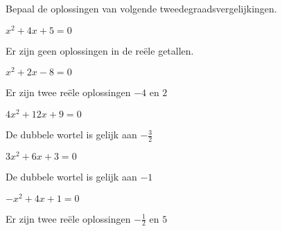 \documentclass{ximera}
\begin{document}
\begin{exercise} Bepaal de oplossingen van volgende tweedegraadsvergelijkingen. 
    
    \begin{question} \( x^2 + 4x + 5    = 0 \) \begin{uitkomst} Er zijn geen oplossingen in de reële getallen.                \end{uitkomst} \end{question}
    \begin{question} \( x^2 + 2x - 8    = 0 \) \begin{uitkomst} Er zijn twee reële oplossingen  \( -4 \) en \( 2 \)           \end{uitkomst} \end{question}
    \begin{question} \( 4x^2 + 12x + 9  = 0 \) \begin{uitkomst} De dubbele wortel is gelijk aan \( -\frac{3}{2} \)            \end{uitkomst} \end{question}
    \begin{question} \( 3x^2 + 6x + 3   = 0 \) \begin{uitkomst} De dubbele wortel is gelijk aan \(  -1 \)                     \end{uitkomst} \end{question}
    \begin{question} \( -x^2 + 4x + 1   = 0 \) \begin{uitkomst} Er zijn twee reële oplossingen  \( -\frac{1}{2} \) en \( 5 \) \end{uitkomst} \end{question}
    
\end{exercise}
\end{document}
